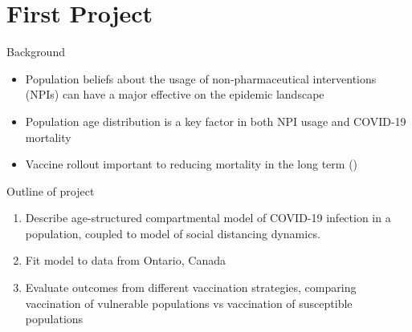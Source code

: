 \documentclass{beamer}
\begin{document}
\section{First Project}
\begin{frame}{Background}
    \begin{itemize}
        \item Population beliefs about the usage of non-pharmaceutical interventions (NPIs) can have a major effective on the epidemic landscape
        \item Population age distribution is a key factor in both NPI usage and COVID-19 mortality
        \item Vaccine rollout important to reducing mortality in the long term (\cite{bubar2020model,hoyt2020vaccine})
    \end{itemize}
\end{frame}
\begin{frame}

    Outline of project
    \begin{enumerate}
        \item Describe age-structured compartmental model of COVID-19 infection in a population, coupled to model of social distancing dynamics. 
        \item Fit model to data from Ontario, Canada
        \item Evaluate outcomes from different vaccination strategies, comparing vaccination of vulnerable populations vs vaccination of susceptible populations
    \end{enumerate}
\end{frame}
\end{document}

